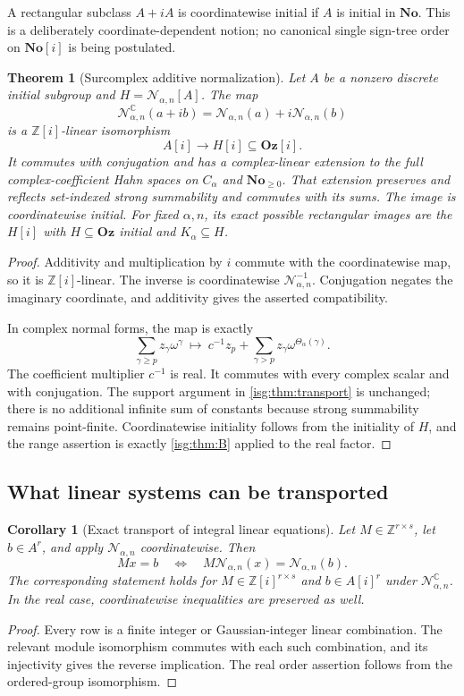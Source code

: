 \documentclass[11pt]{article}
\newtheorem{theorem}{Theorem}[section]
\newtheorem{corollary}[corollary]{Corollary}
\theoremstyle{definition}
\theoremstyle{remark}
\newcommand{\No}{\ensuremath{\mathbf{No}}}
\newcommand{\Oz}{\ensuremath{\mathbf{Oz}}}
\newcommand{\C}{\mathbb{C}}
\newcommand{\Z}{\mathbb{Z}}
\newcommand{\Rect}{\mathcal{N}_{\alpha,n}}
\newcommand{\tht}{\Theta_{\alpha}}
\begin{document}
\begin{definition}\label{isg:def:rectangular}
A rectangular subclass $A+iA$ is coordinatewise initial if $A$ is
initial in $\No$. This is a deliberately coordinate-dependent notion;
no canonical single sign-tree order on $\No[i]$ is being postulated.
\end{definition}

\begin{theorem}[Surcomplex additive normalization]\label{isg:thm:complex}
Let $A$ be a nonzero discrete initial subgroup and $H=\Rect[A]$.
The map
\[
 \Rect^{\C}(a+ib)=\Rect(a)+i\Rect(b)
\]
is a $\Z[i]$-linear isomorphism
\[
 A[i]\longrightarrow H[i]\subseteq\Oz[i].
\]
It commutes with conjugation and has a complex-linear extension to the
full complex-coefficient Hahn spaces on $C_\alpha$ and
$\No_{\ge0}$. That extension preserves and reflects set-indexed strong
summability and commutes with its sums. The image is coordinatewise
initial. For fixed $\alpha,n$, its exact possible rectangular images
are the $H[i]$ with $H\subseteq\Oz$ initial and $K_\alpha\subseteq H$.
\end{theorem}
\begin{proof}
Additivity and multiplication by $i$ commute with the coordinatewise
map, so it is $\Z[i]$-linear. The inverse is coordinatewise
$\Rect^{-1}$. Conjugation negates the imaginary coordinate, and
additivity gives the asserted compatibility.

In complex normal forms, the map is exactly
\[
 \sum_{\gamma\ge p}z_\gamma\omega^\gamma
 \ \longmapsto\ c^{-1}z_p+
      \sum_{\gamma>p}z_\gamma\omega^{\tht(\gamma)}.
\]
The coefficient multiplier $c^{-1}$ is real. It commutes with every
complex scalar and with conjugation. The support argument in
\cref{isg:thm:transport} is unchanged; there is no additional infinite sum
of constants because strong summability remains point-finite.
Coordinatewise initiality follows from the initiality of $H$, and the
range assertion is exactly \cref{isg:thm:B} applied to the real factor.
\end{proof}

\subsection{What linear systems can be transported}
\begin{corollary}[Exact transport of integral linear equations]\label{isg:cor:linear}
Let $M\in\Z^{r\times s}$, let $b\in A^r$, and apply $\Rect$
coordinatewise. Then
\[
 Mx=b\quad\Longleftrightarrow\quad M\Rect(x)=\Rect(b).
\]
The corresponding statement holds for $M\in\Z[i]^{r\times s}$ and
$b\in A[i]^r$ under $\Rect^{\C}$. In the real case, coordinatewise
inequalities are preserved as well.
\end{corollary}
\begin{proof}
Every row is a finite integer or Gaussian-integer linear combination.
The relevant module isomorphism commutes with each such combination,
and its injectivity gives the reverse implication. The real order
assertion follows from the ordered-group isomorphism.
\end{proof}
\end{document}
